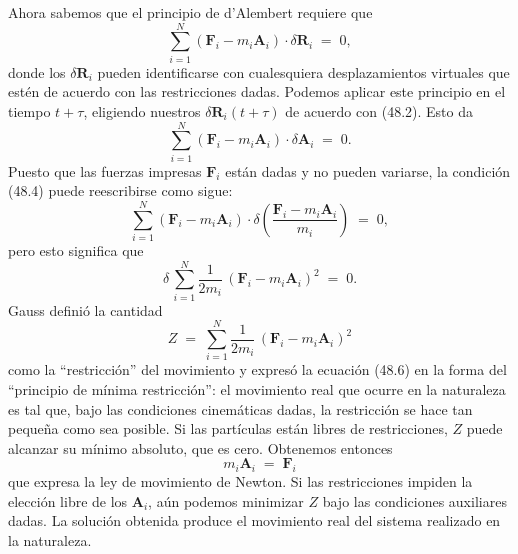 \documentclass[12pt,a4paper]{book}
\begin{document}
Ahora sabemos que el principio de d'Alembert requiere que
\begin{equation}
\sum_{i=1}^{N} (\mathbf{F}_i - m_i \mathbf{A}_i) \cdot \delta\mathbf{R}_i \;=\; 0, \tag{48.3}
\end{equation}
donde los $\delta\mathbf{R}_i$ pueden identificarse con cualesquiera desplazamientos virtuales que estén de acuerdo con las restricciones dadas. Podemos aplicar este principio en el tiempo $t + \tau$, eligiendo nuestros $\delta\mathbf{R}_i(t + \tau)$ de acuerdo con (48.2). Esto da
\begin{equation}
\sum_{i=1}^{N} (\mathbf{F}_i - m_i \mathbf{A}_i) \cdot \delta\mathbf{A}_i \;=\; 0. \tag{48.4}
\end{equation}
Puesto que las fuerzas impresas $\mathbf{F}_i$ están dadas y no pueden variarse, la condición (48.4) puede reescribirse como sigue:
\begin{equation}
\sum_{i=1}^{N} (\mathbf{F}_i - m_i \mathbf{A}_i) \cdot \delta\!\left(\frac{\mathbf{F}_i - m_i \mathbf{A}_i}{m_i}\right) \;=\; 0, \tag{48.5}
\end{equation}
pero esto significa que
\begin{equation}
\delta\,\sum_{i=1}^{N}\frac{1}{2m_i}\,(\mathbf{F}_i - m_i \mathbf{A}_i)^2 \;=\; 0. \tag{48.6}
\end{equation}
Gauss definió la cantidad
\begin{equation}
Z \;=\; \sum_{i=1}^{N}\frac{1}{2m_i}\,(\mathbf{F}_i - m_i \mathbf{A}_i)^2 \tag{48.7}
\end{equation}
como la ``restricción'' del movimiento y expresó la ecuación (48.6) en la forma del ``principio de mínima restricción'': el movimiento real que ocurre en la naturaleza es tal que, bajo las condiciones cinemáticas dadas, la restricción se hace tan pequeña como sea posible. Si las partículas están libres de restricciones, $Z$ puede alcanzar su mínimo absoluto, que es cero. Obtenemos entonces
\begin{equation}
m_i \mathbf{A}_i \;=\; \mathbf{F}_i \tag{48.8}
\end{equation}
que expresa la ley de movimiento de Newton. Si las restricciones impiden la elección libre de los $\mathbf{A}_i$, aún podemos minimizar $Z$ bajo las condiciones auxiliares dadas. La solución obtenida produce el movimiento real del sistema realizado en la naturaleza.
\end{document}
